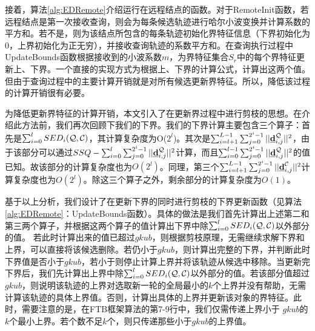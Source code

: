接着，算法\ref{alg:EDRemote}介绍运行在远程结点的函数。对于\textsf{RemoteInit}函数，若远程结点是第一次接收查询，则会为每条候选轨迹进行哈尔小波变换并计算系数的平方和。若不是，则为该结点所包含的每条轨迹初始化界特征信息（下界初始化为0，上界初始化为正无穷），并接收查询轨迹的系数平方和。在查询执行过程中\textsf{UpdateBounds}函数根据接收到的小波系数$m$，为界特征集合$S_{r}$中的每个界特征更新上、下界。一个直接的实现方式为根据上、下界的计算公式，计算出这两个值。但由于查询过程中的主要计算开销就是对所有候选更新界特征。所以，降低该过程的计算开销很有必要。

为降低更新界特征的计算开销，本文引入了在更新界过程中进行剪枝的思想。在介绍此方法前，我们再次回顾下我们的下界。我们的下界计算主要包含三个算子：首先是$\sum_{i=0}^{l}SED_{i}({\cal Q},{\cal C})$，其计算复杂度为O($2^{l}$)。其次是$\sum_{i=l+1}^{L-1}\sum_{j=0}^{2^i-1}||\emph{{\textbf{d}}}_{i,j}^{\cal Q}||^2$，由于该部分可以通过$SSQ-\sum_{i=0}^{l}\sum_{j=0}^{2^i-1}||\emph{{\textbf{d}}}_{i,j}^{\cal Q}||^2$计算，而且$\sum_{i=0}^{l-1}\sum_{j=0}^{2^i-1}||\emph{{\textbf{d}}}_{i,j}^{\cal Q}||^2$的值已知。故该部分的计算复杂度也为$O(2^{l})$。同理，第三个$\sum_{i=l+1}^{L-1}\sum_{j=0}^{2^i-1}||\emph{{\textbf{d}}}_{i,j}^{\cal C}||^2$计算复杂度也为$O(2^{l})$。除这三个算子之外，剩余部分的计算复杂度为$O(1)$。

基于以上分析，我们设计了在更新下界的同时进行剪枝的下界更新函数（见算法\ref{alg:EDRemote}：\textsf{UpdateBounds}函数）。具体的做法是我们首先计算出上述第二和第三两个算子，并根据这两个算子的值计算出下界中除$\sum_{i=0}^{l}SED_{i}({\cal Q},{\cal C})$以外部分的值。
若此时计算出来的值已超过$gkub$，则根据剪枝原理，无需继续求解下界和上界，可以直接将该候选删除。若仍小于$gkub$，则计算出完整的下界，并判断此时下界值是否小于$gkub$，若小于则停止计算上界并将该轨迹从候选中移除。当更新完下界后，我们先计算出上界中除$\sum_{i=0}^{l}SED_{i}({\cal Q},{\cal C})$以外部分的值。若该部分值超过$gkub$，则说明该轨迹的上界对选取新一轮的全局最小的$k$个上界并没有帮助，无需计算该轨迹的具体上界值。否则，计算出具体的上界并更新该对象的界特征。此时，需要注意的是，在FTB框架算法的第7-9行中，我们仅需传递上界小于 $gkub$的$k$个最小上界。若个数不足$k$个，则只传递那些小于$gkub$的上界值。
 
